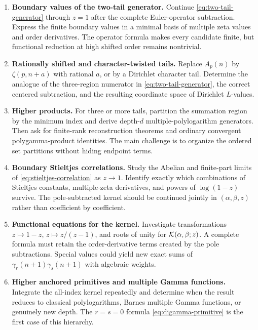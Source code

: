 \begin{enumerate}[label=\textbf{R\arabic*.},leftmargin=*]
\item \textbf{Boundary values of the two-tail generator.}
Continue \eqref{eq:two-tail-generator} through $z=1$ after the complete
Euler-operator subtraction.  Express the finite boundary values in a
minimal basis of multiple zeta values and order derivatives.  The
operator formula makes every candidate finite, but functional reduction
at high shifted order remains nontrivial.

\item \textbf{Rationally shifted and character-twisted tails.}
Replace $A_p(n)$ by $\zeta(p,n+a)$ with rational $a$, or by a Dirichlet
character tail.  Determine the analogue of the three-region numerator
in \eqref{eq:two-tail-generator}, the correct centered subtraction, and
the resulting coordinate space of Dirichlet $L$-values.

\item \textbf{Higher products.}
For three or more tails, partition the summation region by the minimum
index and derive depth-$d$ multiple-polylogarithm generators.  Then ask
for finite-rank reconstruction theorems and ordinary convergent
polygamma-product identities.  The main challenge is to organize the
ordered set partitions without hiding endpoint terms.

\item \textbf{Boundary Stieltjes correlations.}
Study the Abelian and finite-part limits of
\eqref{eq:stieltjes-correlation} as $z\to1$.  Identify exactly which
combinations of Stieltjes constants, multiple-zeta derivatives, and
powers of $\log(1-z)$ survive.  The pole-subtracted kernel should be
continued jointly in $(\alpha,\beta,z)$ rather than coefficient by
coefficient.

\item \textbf{Functional equations for the kernel.}
Investigate transformations $z\mapsto1-z$, $z\mapsto z/(z-1)$, and
roots of unity for $\mathcal{K}(\alpha,\beta;z)$.  A complete formula must retain
the order-derivative terms created by the pole subtractions.  Special
values could yield new exact sums of
$\gamma_r(n+1)\gamma_s(n+1)$ with algebraic weights.

\item \textbf{Higher anchored primitives and multiple Gamma functions.}
Integrate the all-index kernel repeatedly and determine when the result
reduces to classical polylogarithms, Barnes multiple Gamma functions,
or genuinely new depth.  The $r=s=0$ formula
\eqref{eq:digamma-primitive} is the first case of this hierarchy.


\end{enumerate}
